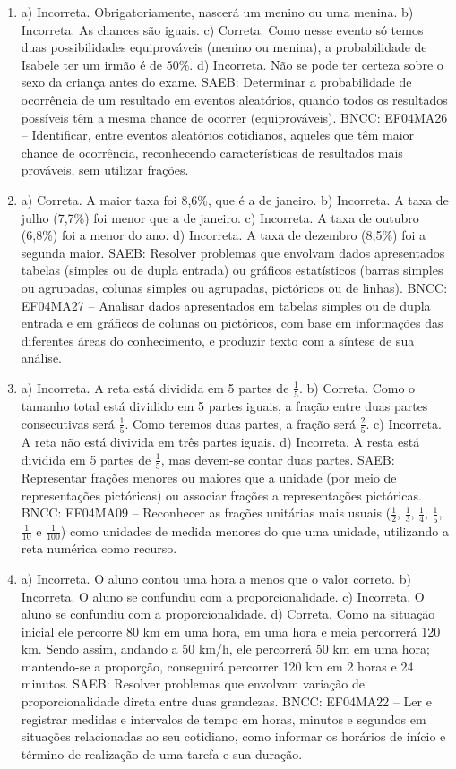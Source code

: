 \begin{enumerate}
\item
a) Incorreta. Obrigatoriamente, nascerá um menino ou uma menina.
b) Incorreta. As chances são iguais.
c) Correta. Como nesse evento só temos duas possibilidades equiprováveis (menino ou
menina), a probabilidade de Isabele ter um irmão é de 50\%.
d) Incorreta. Não se pode ter certeza sobre o sexo da criança antes do exame.
SAEB: Determinar a probabilidade de ocorrência de um
resultado em eventos aleatórios, quando todos os resultados possíveis
têm a mesma chance de ocorrer (equiprováveis).
BNCC: EF04MA26 -- Identificar, entre eventos aleatórios cotidianos, aqueles que têm maior chance de
ocorrência, reconhecendo características de resultados mais prováveis, sem utilizar frações.

\item
a) Correta. A maior taxa foi 8,6\%, que é a de janeiro.
b) Incorreta. A taxa de julho (7,7\%) foi menor que a de janeiro.
c) Incorreta. A taxa de outubro (6,8\%) foi a menor do ano.
d) Incorreta. A taxa de dezembro (8,5\%) foi a segunda maior.
SAEB: Resolver problemas que envolvam dados apresentados
tabelas (simples ou de dupla entrada) ou gráficos estatísticos (barras
simples ou agrupadas, colunas simples ou agrupadas, pictóricos ou de
linhas).
BNCC: EF04MA27 -- Analisar dados apresentados em tabelas simples ou de dupla entrada e em gráficos de
colunas ou pictóricos, com base em informações das diferentes áreas do conhecimento, e produzir
texto com a síntese de sua análise.

\item
a) Incorreta. A reta está dividida em 5 partes de $\frac{1}{5}$.
b) Correta. Como o tamanho total está dividido em 5 partes iguais, a fração entre
duas partes consecutivas será $\frac{1}{5}$. Como teremos duas partes, a fração
será $\frac{2}{5}$.
c) Incorreta. A reta não está divivida em três partes iguais.
d) Incorreta. A resta está dividida em 5 partes de $\frac{1}{5}$, mas devem-se contar duas partes.
SAEB: Representar frações menores ou maiores que a unidade
(por meio de representações pictóricas) ou associar frações a
representações pictóricas.
BNCC: EF04MA09 -- Reconhecer as frações unitárias mais usuais ($\frac{1}{2}$, $\frac{1}{3}$, $\frac{1}{4}$, $\frac{1}{5}$, $\frac{1}{10}$ e $\frac{1}{100}$) como
unidades de medida menores do que uma unidade, utilizando a reta numérica como recurso.

\item
a) Incorreta. O aluno contou uma hora a menos que o valor correto.
b) Incorreta. O aluno se confundiu com a proporcionalidade.
c) Incorreta. O aluno se confundiu com a proporcionalidade.
d) Correta. Como na situação inicial ele percorre 80 km em uma hora, em uma hora e
meia percorrerá 120 km. Sendo assim, andando a 50 km/h, ele percorrerá 50 km em uma hora;
mantendo-se a proporção, conseguirá percorrer 120 km em 2 horas e 24
minutos.
SAEB: Resolver problemas que envolvam variação de
proporcionalidade direta entre duas grandezas.
BNCC: EF04MA22 -- Ler e registrar medidas e intervalos de tempo em horas, minutos e segundos em
situações relacionadas ao seu cotidiano, como informar os horários de início e término de realização
de uma tarefa e sua duração.


\end{enumerate}
